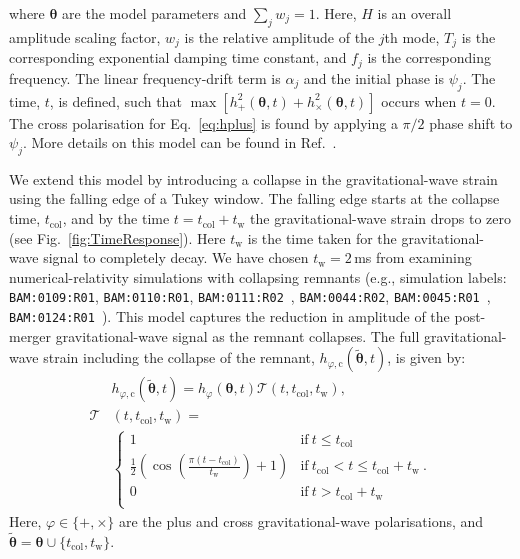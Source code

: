 \documentclass[
reprint,
prd,
twocolumn,
nofootinbib,
tightenlines %
floatfix,
 amsmath,
showpacs ,amssymb, aps,%
superscriptaddress
]{revtex4-1}
\newcommand{\tc}{t_{\mathrm{col}}}
\newcommand{\tw}{t_{\mathrm{w}}}
\begin{document}
    where $\boldsymbol{\theta}$ are the model parameters and $\sum_{j} w_j=1$. 
    Here, $H$ is an overall amplitude scaling factor, $w_j$ is the relative amplitude of the $j$th mode, $T_j$ is the corresponding exponential damping time constant, and $f_j$ is the corresponding frequency.
    The linear frequency-drift term is $\alpha_j$ and the initial phase  is $\psi_j$.
    The time, $t$, is defined, such that $\max\left[h_+^2(\boldsymbol{\theta},t)+h_\times^2(\boldsymbol{\theta},t)\right]$ occurs when $t=0$. 
    The cross polarisation for Eq.~\ref{eq:hplus} is found by applying a $\pi/2$ phase shift to $\psi_j$.
    More details on this model can be found in Ref.~\cite{Easter2020}.
    
    We extend this model by introducing a collapse in the gravitational-wave strain using the falling edge of a Tukey window.
    The falling edge starts at the collapse time, $\tc$, and by the time $t=\tc+\tw$ the gravitational-wave strain drops to zero (see Fig.~\ref{fig:TimeResponse}). 
    Here $\tw$ is the time taken for the gravitational-wave signal to completely decay.
    We have chosen $\tw=2$\,ms from examining numerical-relativity simulations with collapsing remnants (e.g., simulation labels: \texttt{BAM:0109:R01}, \texttt{BAM:0110:R01}, \texttt{BAM:0111:R02}~\cite{Dietrich2018}, \texttt{BAM:0044:R02}, \texttt{BAM:0045:R01}~\cite{Dietrich2017c}, \texttt{BAM:0124:R01}~\cite{Dietrich2017}).
    This model captures the reduction in amplitude of the post-merger gravitational-wave signal as the remnant collapses.
    The full gravitational-wave strain including the collapse of the remnant, $h_{\varphi,\mathrm{c}}(\boldsymbol{\tilde{\theta}},t)$, is given by:
\begin{align}
        & h_{\varphi,\mathrm{c}}(\boldsymbol{\tilde{\theta}},t)    =  h_{\varphi}(\boldsymbol{\theta},t)\mathcal{T}\left(t , \tc,\tw\right), \label{eq:hcol}\\ 
        \mathcal{T} & (t,\tc,\tw) =    \nonumber  \\
        &\begin{cases} 
            1 &\text{if}\ t \leqslant  \tc \\ 
            \frac{1}{2}\left(\cos\left(\frac{\pi (t-\tc)}{\tw}\right) +1 \right)  &\text{if}\ \tc < t \leqslant \tc+\tw\ \text{.} \label{eq:tukeyfallingedge} \\
            0  &\text{if}\  t > \tc+\tw\\ 
        \end{cases}
\end{align}
    Here, $\varphi\in\{+,\times\}$ are the plus and cross gravitational-wave polarisations, and $\boldsymbol{\tilde{\theta}}= \boldsymbol{\theta} \cup \{\tc,\tw\}$. \par
    
\end{document}

